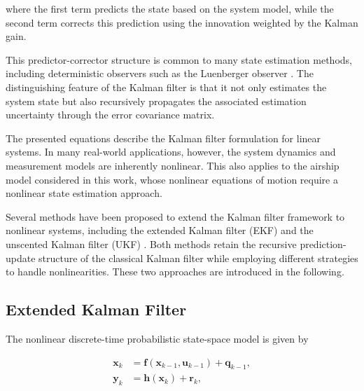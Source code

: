 where the first term predicts the state based on the system model, while the second term corrects this prediction using the innovation weighted by the Kalman gain.

This predictor-corrector structure is common to many state estimation methods, including deterministic observers such as the Luenberger observer \cite{Luenberger1964, Luenberger1966}. The distinguishing feature of the Kalman filter is that it not only estimates the system state but also recursively propagates the associated estimation uncertainty through the error covariance matrix.


The presented equations describe the Kalman filter formulation for linear systems. In many real-world applications, however, the system dynamics and measurement models are inherently nonlinear. This also applies to the airship model considered in this work, whose nonlinear equations of motion require a nonlinear state estimation approach.

Several methods have been proposed to extend the Kalman filter framework to nonlinear systems, including the extended Kalman filter (EKF) and the unscented Kalman filter (UKF) \cite{Maybeck1979KF,Simon2006KF,Julier1997UKF}. 
Both methods retain the recursive prediction-update structure of the classical Kalman filter while employing different strategies to handle nonlinearities. These two approaches are introduced in the following.





\subsection{Extended Kalman Filter}
\label{sec:2.4.1EKF}

The nonlinear discrete-time probabilistic state-space model is given by

\begin{align}
	\bm{x}_k 
	&= 
	\bm{f}(\bm{x}_{k-1}, \bm{u}_{k-1}) + \bm{q}_{k-1}, 
	\label{eq:ekf_system} 
	\\[4pt]
	\bm{y}_k 
	&= 
	\bm{h}(\bm{x}_k) + \bm{r}_k,
	\label{eq:ekf_measurement}
\end{align}

